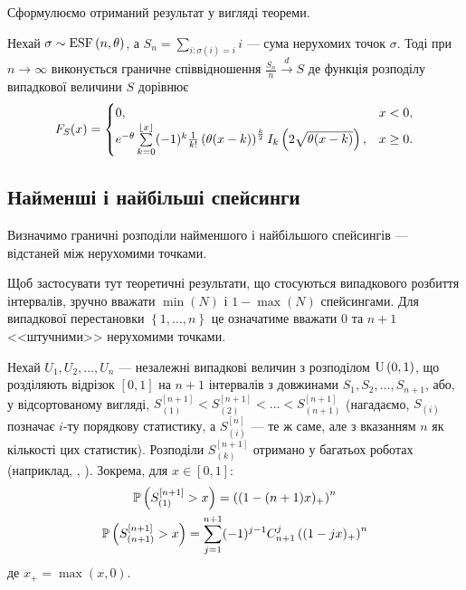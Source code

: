 Сформулюємо отриманий результат у вигляді теореми.
\begin{theorem}
    Нехай $\sigma \sim \ESF{n, \theta}$, а 
    $S_n = \sum_{i : \sigma(i) = i} i$ --- сума нерухомих точок $\sigma$.
    Тоді при $n\to\infty$ виконується граничне
    співвідношення
    $\frac{S_n}{n} \overset{d}{\longrightarrow} S$
    де функція розподілу випадкової величини $S$ дорівнює
    \begin{gather}
        F_{S}(x) = \begin{cases}
            0, & x < 0, \\
            e^{-\theta}
            \sum\limits_{k=0}^{\floor*{x}}
            (-1)^k \frac{1}{k!}\left(\theta(x-k)\right)^{\frac{k}{2}} I_k\left(2\sqrt{\theta(x-k)}\right), & x \geq 0.
        \end{cases}
    \end{gather}
\end{theorem}

\subsection{Найменші і найбільші спейсинги}
Визначимо граничні розподіли найменшого і найбільшого спейсингів --- відстаней
між нерухомими точками.
\begin{remark}
    Щоб застосувати тут теоретичні результати, що стосуються
    випадкового розбиття інтервалів, зручно вважати
    $\min(N)$ і $1-\max(N)$ спейсингами. Для випадкової
    перестановки $\left\{1, \dots, n\right\}$ це означатиме
    вважати $0$ та $n+1$ <<штучними>> нерухомими точками.
\end{remark}

Нехай $U_1, U_2, \dots, U_{n}$ ---
незалежні випадкові величин
з розподілом $\Unif{0, 1}$, що розділяють відрізок $[0, 1]$ на $n+1$
інтервалів з довжинами $S_1, S_2, \dots, S_{n+1}$, або, у відсортованому вигляді, 
$S_{(1)}^{[n+1]} < S_{(2)}^{[n+1]} < \dots < S_{(n+1)}^{[n+1]}$
(нагадаємо, $S_{(i)}$ позначає $i$-ту порядкову статистику, а
$S_{(i)}^{[n]}$ --- те ж саме, але з вказанням $n$ як кількості цих статистик).
Розподіли $S_{(k)}^{[n+1]}$ отримано у багатьох роботах
(наприклад, \cite{Holst_1980}, \cite{Pinelis_2019}). Зокрема, для $x\in[0,1]$:
\begin{gather}
    \label{min_spacing}
    \P{S_{(1)}^{[n+1]} > x} = \left((1-(n+1)x)_+\right)^n \\
    \label{max_spacing}
    \P{S_{(n+1)}^{[n+1]} > x} = 
    \sum_{j=1}^{n+1} (-1)^{j-1} C_{n+1}^j \left((1-jx)_+\right)^n
\end{gather}
де $x_+ = \max(x, 0)$.

